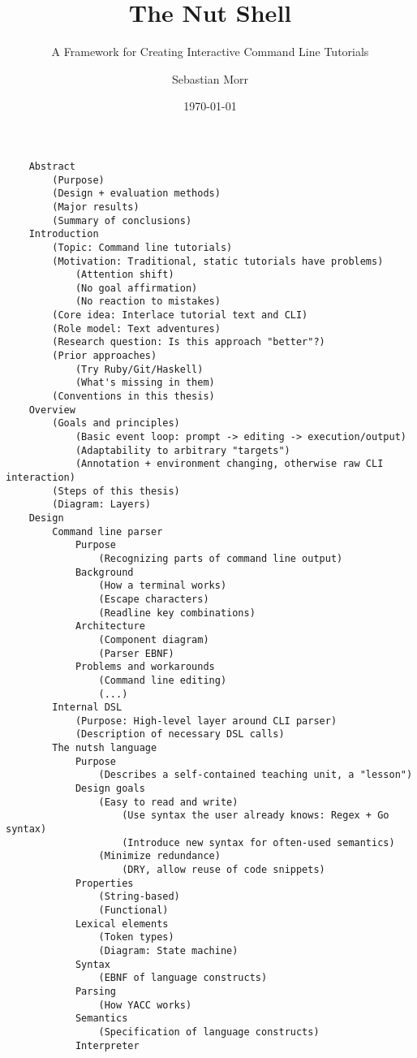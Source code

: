 \documentclass{scrreprt}
\title{The Nut Shell}
\subtitle{A Framework for Creating Interactive Command Line Tutorials}
\author{Sebastian Morr}
\date{\today}
\begin{document}
\maketitle
\tableofcontents

\begin{verbatim}
    Abstract
        (Purpose)
        (Design + evaluation methods)
        (Major results)
        (Summary of conclusions)
    Introduction
        (Topic: Command line tutorials)
        (Motivation: Traditional, static tutorials have problems)
            (Attention shift)
            (No goal affirmation)
            (No reaction to mistakes)
        (Core idea: Interlace tutorial text and CLI)
        (Role model: Text adventures)
        (Research question: Is this approach "better"?)
        (Prior approaches)
            (Try Ruby/Git/Haskell)
            (What's missing in them)
        (Conventions in this thesis)
    Overview
        (Goals and principles)
            (Basic event loop: prompt -> editing -> execution/output)
            (Adaptability to arbitrary "targets")
            (Annotation + environment changing, otherwise raw CLI interaction)
        (Steps of this thesis)
        (Diagram: Layers)
    Design
        Command line parser
            Purpose
                (Recognizing parts of command line output)
            Background
                (How a terminal works)
                (Escape characters)
                (Readline key combinations)
            Architecture
                (Component diagram)
                (Parser EBNF)
            Problems and workarounds
                (Command line editing)
                (...)
        Internal DSL
            (Purpose: High-level layer around CLI parser)
            (Description of necessary DSL calls)
        The nutsh language
            Purpose
                (Describes a self-contained teaching unit, a "lesson")
            Design goals
                (Easy to read and write)
                    (Use syntax the user already knows: Regex + Go syntax)
                    (Introduce new syntax for often-used semantics)
                (Minimize redundance)
                    (DRY, allow reuse of code snippets)
            Properties
                (String-based)
                (Functional)
            Lexical elements
                (Token types)
                (Diagram: State machine)
            Syntax
                (EBNF of language constructs)
            Parsing
                (How YACC works)
            Semantics
                (Specification of language constructs)
            Interpreter

\end{verbatim}
\end{document}
